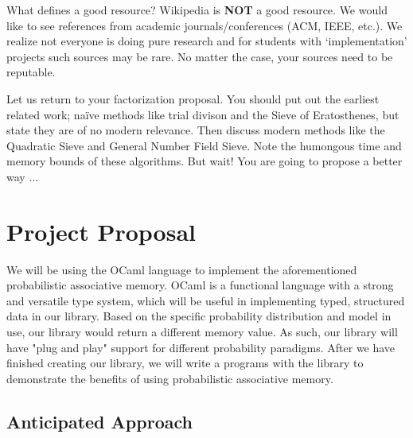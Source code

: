 \documentclass{sig-alternate}
\begin{document}
What defines a good resource? Wikipedia is \textbf{NOT} a good
resource. We would like to see references from academic
journals/conferences (ACM, IEEE, etc.). We realize not everyone is
doing pure research and for students with `implementation' projects
such sources may be rare. No matter the case, your sources need to be
reputable.

Let us return to your factorization proposal. You should put out the
earliest related work; na\"{i}ve methods like trial divison and the
Sieve of Eratosthenes, but state they are of no modern relevance. Then
discuss modern methods like the Quadratic Sieve and General Number
Field Sieve. Note the humongous time and memory bounds of these
algorithms. But wait! You are going to propose a better way $\ldots$

\section{Project Proposal}
\label{sec:project_proposal}
We will be using the OCaml language to implement the aforementioned probabilistic 
associative memory. OCaml is a functional language with a strong and versatile type 
system, which will be useful in implementing typed, structured data in our library. 
Based on the specific probability distribution and model in use, our library would return 
a different memory value. As such, our library will have "plug and play" support for 
different probability paradigms. After we have finished creating our library, we will 
write a programs with the library to demonstrate the benefits of using probabilistic 
associative memory. 


\subsection{Anticipated Approach}
\label{subsec:approach}
%
\end{document}
